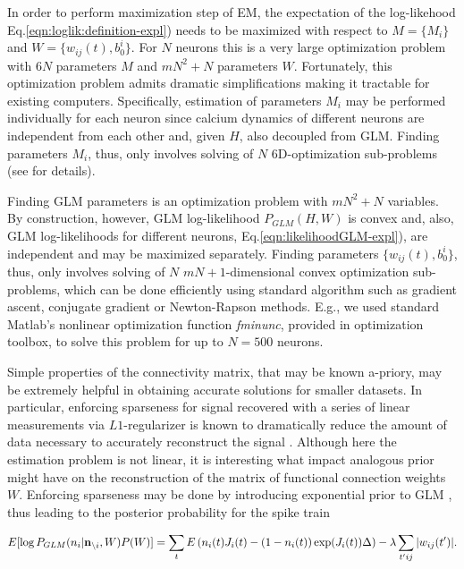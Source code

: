 In order to perform maximization step of EM, the expectation of the log-likehood  Eq.\eqref{eqn:loglik:definition-expl}) needs to be maximized with respect to $M=\{M_i\}$ and $W=\{w_{ij}(t), b_0^i\}$. For $N$ neurons this is a very large optimization problem with $6N$ parameters $M$ and $m N^2 + N$ parameters $W$.  Fortunately, this optimization problem admits dramatic simplifications making it tractable for existing computers.  Specifically, estimation of parameters $M_i$ may be performed individually for each neuron since calcium dynamics of different neurons are independent from each other and, given $H$, also decoupled from GLM. Finding parameters $M_i$, thus, only involves solving of $N$ 6D-optimization sub-problems (see \cite{Vogelstein2009} for details).

Finding GLM parameters is an optimization problem with $mN^2+N$ variables. By construction, however, GLM log-likelihood $P_{GLM}(H, W)$ is convex and, also, GLM log-likelihoods for different neurons, Eq.\eqref{eqn:likelihoodGLM-expl}), are independent and may be maximized separately. Finding parameters $\{w_{ij}(t), b^i_0\}$, thus, only involves solving of $N$ $mN+1$-dimensional convex optimization sub-problems, which can be done efficiently using standard algorithm such as gradient ascent, conjugate gradient or Newton-Rapson methods. E.g., we used standard Matlab's nonlinear optimization function {\em fminunc}, provided in optimization toolbox, to solve this problem for up to $N=500$ neurons.

Simple properties of the connectivity matrix, that may be known a-priory, may be extremely helpful in obtaining accurate solutions for smaller datasets. In particular, enforcing sparseness for signal recovered with a series of linear measurements via $L1$-regularizer is known to dramatically reduce the amount of data necessary to accurately reconstruct the signal \cite{Candes2005, DE03, Mishchenko2009}. Although here the estimation problem is not linear, it is interesting what impact analogous prior might have on the reconstruction of the matrix of functional connection weights $W$. Enforcing sparseness may be done by introducing exponential prior to GLM \cite{Stevenson2009}, thus leading to the posterior probability for the spike train

\begin{equation}\label{eqn:likelihoodsparseGLM}
E[\log P_{GLM}(n_i|{\bf n}_{\backslash i}, W)P(W)]=\sum_t E\left( n_i(t) J_i(t) - (1-n_i(t)) \exp(J_i(t)) \Delta \right)-\lambda \sum_{t'ij}|w_{ij}(t')|.
\end{equation}

